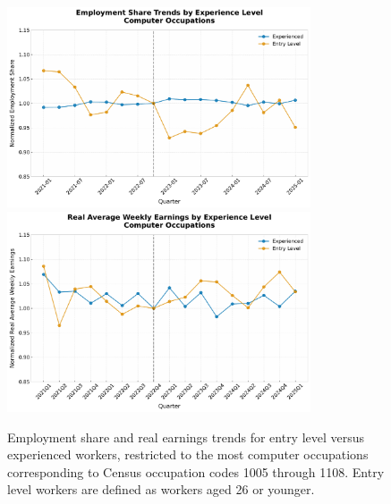 \documentclass[12pt]{article}
\numberwithin{equation}{section}
\theoremstyle{theorem}\newcustomtheorem{theorem}{{\bf\sc Theorem}}
\theoremstyle{definition}\newcustomtheorem{assumption}{{\bf\sc Assumption}}
\theoremstyle{theorem} \newcustomtheorem{proposition}{{\bf\sc Proposition}}
\begin{document}
\begin{figure}[htbp]
	\centering
  \includegraphics[width=0.8\textwidth]{../figures/employment_share_entry_level_computer_occupations_2021Q1.pdf}
  \includegraphics[width=0.8\textwidth]{../figures/real_earnings_by_entry_level_computer.pdf}
	\caption{Employment share and real earnings trends for entry level versus experienced workers, restricted to the most computer occupations corresponding to Census occupation codes 1005 through 1108. Entry level workers are defined as workers aged 26 or younger. }
	\label{fig:employment_share_entry_level_computer_occupations_2021Q1}
\end{figure}
\end{document}
